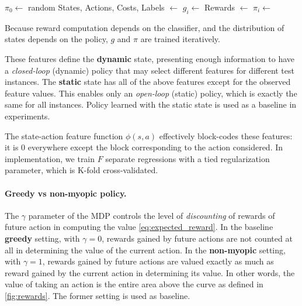 \begin{algorithm}[]

\SetAlgoLined
{}
\BlankLine
$\pi_0 \leftarrow$ random\;
 {
    States, Actions, Costs, Labels $\leftarrow$ \;
    $g_i \leftarrow$ \;
    Rewards $\leftarrow$ \;
    $\pi_i \leftarrow$ \;
}
\caption{Because reward computation depends on the classifier, and the distribution of states depends on the policy, $g$ and $\pi$ are trained iteratively.\label{alg:learning}}
\end{algorithm}

These features define the \textbf{dynamic} state, presenting enough information to have a \emph{closed-loop} (dynamic) policy that may select different features for different test instances.
The \textbf{static} state has all of the above features except for the observed feature values.
This enables only an \emph{open-loop} (static) policy, which is exactly the same for all instances.
Policy learned with the static state is used as a baseline in experiments.

The state-action feature function $\phi(s, a)$ effectively block-codes these features: it is $0$ everywhere except the block corresponding to the action considered.
In implementation, we train $F$ separate regressions with a tied regularization parameter, which is K-fold cross-validated.

\paragraph{Greedy vs non-myopic policy.}
The $\gamma$ parameter of the MDP controls the level of \emph{discounting} of rewards of future action in computing the value \eqref{eq:expected_reward}.
In the baseline \textbf{greedy} setting, with $\gamma=0$, rewards gained by future actions are not counted at all in determining the value of the current action.
In the \textbf{non-myopic} setting, with $\gamma=1$, rewards gained by future actions are valued exactly as much as reward gained by the current action in determining its value.
In other words, the value of taking an action is the entire area above the curve as defined in \autoref{fig:rewards}.
The former setting is used as baseline.

